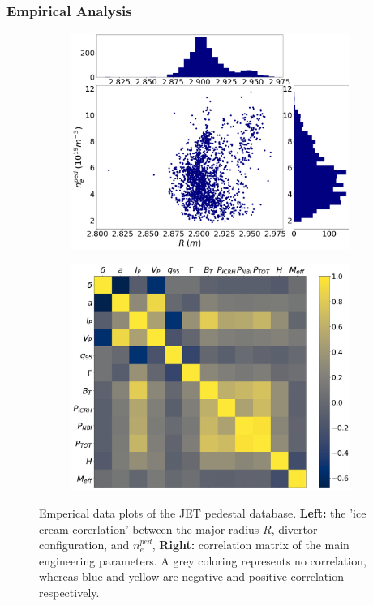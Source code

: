 \documentclass[a4paper, twoside, final, 12pt]{article}
\begin{document}
\subsubsection{Empirical Analysis}
\begin{figure}
        \centering
        \begin{subfigure}{0.5\linewidth}
                \centering
                \includegraphics[scale=0.2]{./src/R_vs_NEPED_matplotlib}
        \end{subfigure} \hfill
        \begin{subfigure}{0.45\linewidth}
                \centering
                \includegraphics[scale=0.2]{./src/input_correlations}
        \end{subfigure}
	\caption{Emperical data plots of the JET pedestal database. \textbf{Left:} the 'ice cream corerlation' between the major radius $R$, divertor configuration, and $n_e^{ped}$,  \textbf{Right:}  correlation matrix of the main engineering parameters. A grey coloring represents no correlation, whereas blue and yellow are negative and positive correlation respectively.}
	\label{fig:emperical}
\end{figure}
\end{document}
